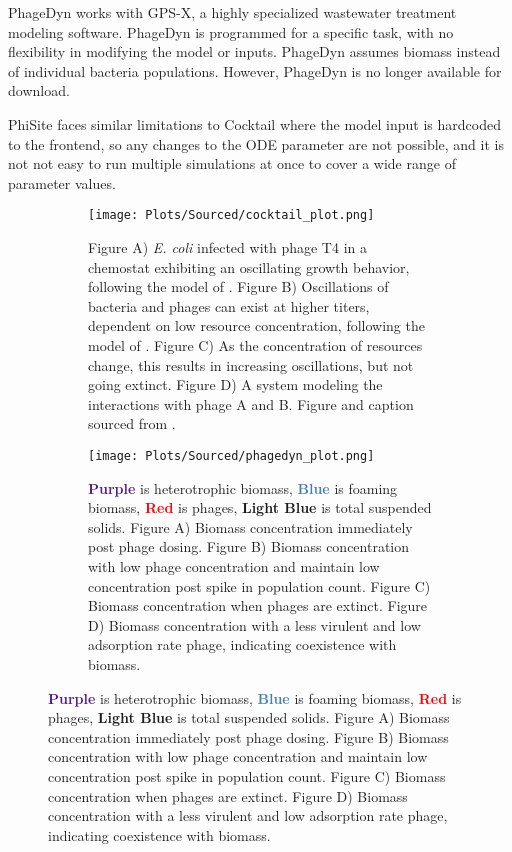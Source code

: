 PhageDyn works with GPS-X, a highly specialized wastewater treatment modeling software. 
PhageDyn is programmed for a specific task, with no flexibility in modifying the model or inputs. 
PhageDyn assumes biomass instead of individual bacteria populations. 
However, PhageDyn is no longer available for download.

PhiSite faces similar limitations to Cocktail where the model input is hardcoded to the frontend, so any changes to the ODE parameter are not possible, and it is not not easy to run multiple simulations at once to cover a wide range of parameter values. 

\begin{figure}
    \centering
    \begin{subfigure}{0.32\linewidth}
        \centering
        \captionsetup{width=1\linewidth}
        \texttt{[image: Plots/Sourced/cocktail\_plot.png]}
        \caption{
            Figure A) \textit{E. coli} infected with phage T4 in a chemostat exhibiting an oscillating growth behavior, following the model of \citet{bohannanEffectResourceEnrichment1997}. 
            Figure B) Oscillations of bacteria and phages can exist at higher titers, dependent on low resource concentration, following the model of \citet{lenskiDynamicsInteractionsBacteria1988}. 
            Figure C) As the concentration of resources change, this results in increasing oscillations, but not going extinct. 
            Figure D) A system modeling the interactions with phage A and B. 
            Figure and caption sourced from \citet{nilssonCocktailComputerProgram2022}. 
        }
        \label{fig:sourced:cocktail_plot}
    \end{subfigure}
    \hfill
    \begin{subfigure}{0.32\linewidth}
        \centering
        \captionsetup{width=1\linewidth}
        \texttt{[image: Plots/Sourced/phagedyn\_plot.png]}
        \caption{
            \textcolor[HTML]{551A8C}{\textbf{Purple}} is heterotrophic biomass, 
            \textcolor[HTML]{4580B4}{\textbf{Blue}} is foaming biomass, 
            \textcolor[HTML]{FF0000}{\textbf{Red}} is phages, 
            \textcolor[HTML]{01E6EE}{\textbf{Light Blue}} is total suspended solids. 
            Figure A) Biomass concentration immediately post phage dosing. 
            Figure B) Biomass concentration with low phage concentration and maintain low concentration post spike in population count. 
            Figure C) Biomass concentration when phages are extinct. 
            Figure D) Biomass concentration with a less virulent and low adsorption rate phage, indicating coexistence with biomass. 
}
\end{subfigure}
\end{figure}
